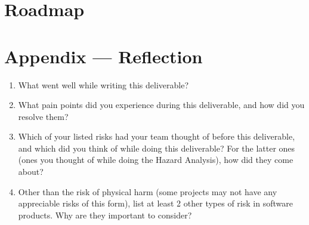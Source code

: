 \documentclass{article}
\begin{document}
\section{Roadmap}


\newpage{}

\section*{Appendix --- Reflection}




\begin{enumerate}
    \item What went well while writing this deliverable? 
    \item What pain points did you experience during this deliverable, and how
    did you resolve them?
    \item Which of your listed risks had your team thought of before this
    deliverable, and which did you think of while doing this deliverable? For
    the latter ones (ones you thought of while doing the Hazard Analysis), how
    did they come about?
    \item Other than the risk of physical harm (some projects may not have any
    appreciable risks of this form), list at least 2 other types of risk in
    software products. Why are they important to consider?
\end{enumerate}
\end{document}
